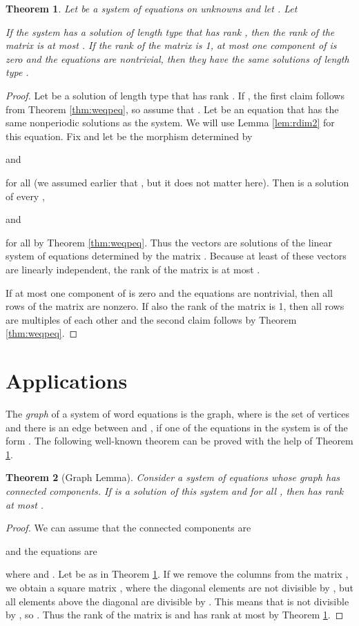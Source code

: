 \documentclass[submission]{eptcs}
\newtheorem{theorem}{Theorem}[section]
\theoremstyle{definition}
\begin{document}
\begin{theorem} \label{thm:rank}
Let  be a system of equations on  unknowns and
let . Let

If the system has a solution of length type  that has rank ,
then the rank of the  matrix  is at most
. If the rank of the matrix is 1, at most one component of 
is zero and the equations are nontrivial, then they have the same
solutions of length type .
\end{theorem}
\begin{proof}
Let  be a solution of length type  that has rank . If
, the first claim follows from Theorem \ref{thm:weqpeq}, so
assume that . Let  be an equation that has the same
nonperiodic solutions as the system. We will use Lemma
\ref{lem:rdim2} for this equation. Fix  and let  be the morphism determined by

and

for all  (we assumed earlier that , but it
does not matter here). Then  is a solution of every
,

and

for all  by Theorem \ref{thm:weqpeq}. Thus the vectors  are solutions of the linear system of equations
determined by the matrix . Because at least  of these
vectors are linearly independent, the rank of the matrix is at most
.

If at most one component of  is zero and the equations are
nontrivial, then all rows of the matrix are nonzero. If also the
rank of the matrix is 1, then all rows are multiples of each other
and the second claim follows by Theorem \ref{thm:weqpeq}.
\end{proof}

\section{Applications} \label{sect:appl}

The \emph{graph} of a system of word equations is the graph, where
 is the set of vertices and there is an edge between  and
, if one of the equations in the system is of the form . The following well-known theorem can be proved with the help
of Theorem \ref{thm:rank}.

\begin{theorem}[Graph Lemma] \label{thm:graph}
Consider a system of equations whose graph has  connected
components. If  is a solution of this system and  for all , then  has rank at most .
\end{theorem}
\begin{proof}
We can assume that the connected components are

and the equations are

where 
and . Let  be as in Theorem \ref{thm:rank}. If we
remove the columns  from the 
matrix , we obtain a square matrix , where the diagonal
elements are not divisible by , but all elements above the
diagonal are divisible by . This means that  is not
divisible by , so . Thus the rank of the matrix
 is  and  has rank at most  by Theorem
\ref{thm:rank}.
\end{proof}
\end{document}
